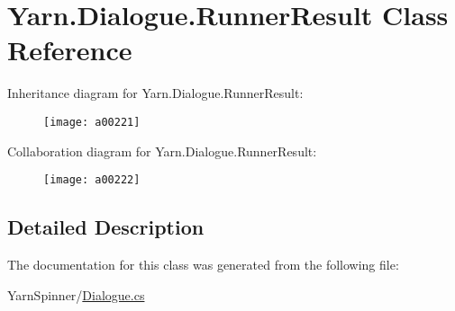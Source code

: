 \hypertarget{a00069}{\section{Yarn.\-Dialogue.\-Runner\-Result Class Reference}
\label{a00069}
}


Inheritance diagram for Yarn.\-Dialogue.\-Runner\-Result\-:
\nopagebreak
\begin{figure}[H]
\begin{center}
\leavevmode
\texttt{[image: a00221]}
\end{center}
\end{figure}


Collaboration diagram for Yarn.\-Dialogue.\-Runner\-Result\-:
\nopagebreak
\begin{figure}[H]
\begin{center}
\leavevmode
\texttt{[image: a00222]}
\end{center}
\end{figure}


\subsection{Detailed Description}


The documentation for this class was generated from the following file\-:\begin{DoxyCompactItemize}
\item 
Yarn\-Spinner/\hyperlink{a00117}{Dialogue.\-cs}\end{DoxyCompactItemize}
